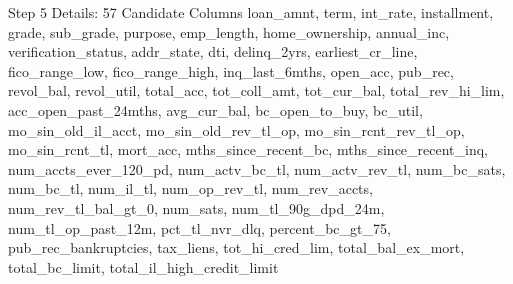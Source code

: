 \documentclass{beamer}
\begin{document}
\begin{frame}{Step 5 Details: 57 Candidate Columns}
  \tiny
  loan\_amnt, term, int\_rate, installment, grade, sub\_grade, purpose, emp\_length, home\_ownership, annual\_inc, verification\_status, addr\_state, dti, delinq\_2yrs, earliest\_cr\_line, fico\_range\_low, fico\_range\_high, inq\_last\_6mths, open\_acc, pub\_rec, revol\_bal, revol\_util, total\_acc, tot\_coll\_amt, tot\_cur\_bal, total\_rev\_hi\_lim, acc\_open\_past\_24mths, avg\_cur\_bal, bc\_open\_to\_buy, bc\_util, mo\_sin\_old\_il\_acct, mo\_sin\_old\_rev\_tl\_op, mo\_sin\_rcnt\_rev\_tl\_op, mo\_sin\_rcnt\_tl, mort\_acc, mths\_since\_recent\_bc, mths\_since\_recent\_inq, num\_accts\_ever\_120\_pd, num\_actv\_bc\_tl, num\_actv\_rev\_tl, num\_bc\_sats, num\_bc\_tl, num\_il\_tl, num\_op\_rev\_tl, num\_rev\_accts, num\_rev\_tl\_bal\_gt\_0, num\_sats, num\_tl\_90g\_dpd\_24m, num\_tl\_op\_past\_12m, pct\_tl\_nvr\_dlq, percent\_bc\_gt\_75, pub\_rec\_bankruptcies, tax\_liens, tot\_hi\_cred\_lim, total\_bal\_ex\_mort, total\_bc\_limit, total\_il\_high\_credit\_limit
\end{frame}
\end{document}
